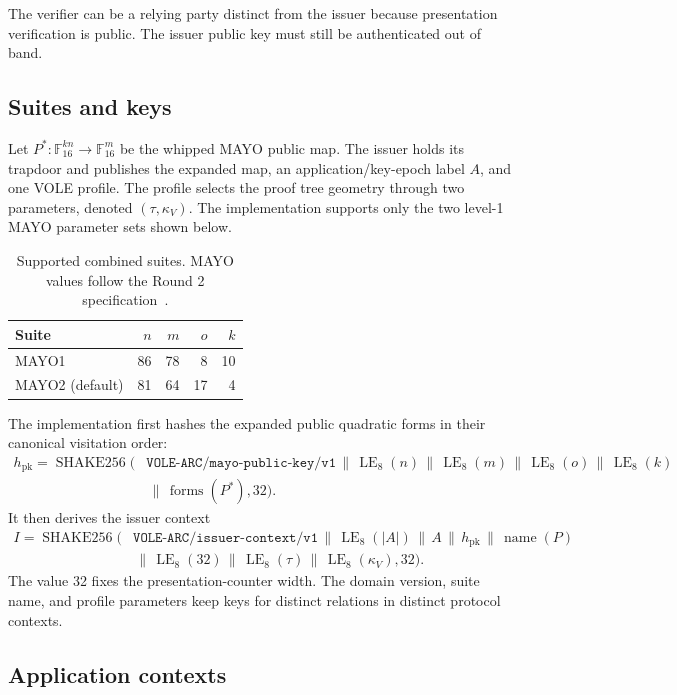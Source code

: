 \documentclass[11pt]{article}
\newcommand{\concat}{\,\|\,}
\newcommand{\F}{\mathbb{F}_{16}}
\newcommand{\LE}[1]{\operatorname{LE}_{#1}}
\newcommand{\XOF}{\operatorname{SHAKE256}}
\newcommand{\domain}[1]{\texttt{#1}}
\theoremstyle{remark}
\begin{document}
The verifier can be a relying party distinct from the issuer because
presentation verification is public. The issuer public key must still be
authenticated out of band.

\subsection{Suites and keys}

Let $P^*:\F^{kn}\rightarrow\F^m$ be the whipped MAYO public map. The issuer
holds its trapdoor and publishes the expanded map, an application/key-epoch
label $A$, and one VOLE profile. The profile selects the proof tree geometry
through two parameters, denoted $(\tau,\kappa_V)$. The implementation
supports only the two level-1 MAYO parameter sets shown below.

\begin{table}[H]
  \centering
  \caption{Supported combined suites. MAYO values follow the Round 2
  specification~\cite{mayo-round2}.}
  \begin{tabular}{lrrrr}
    \toprule
    Suite & $n$ & $m$ & $o$ & $k$ \\
    \midrule
    MAYO1 & 86 & 78 & 8 & 10 \\
    MAYO2 (default) & 81 & 64 & 17 & 4 \\
    \bottomrule
  \end{tabular}
\end{table}

The implementation first hashes the expanded public quadratic forms in their
canonical visitation order:
\begin{align*}
  h_{\mathrm{pk}} = \XOF(&
    \domain{VOLE-ARC/mayo-public-key/v1} \concat
    \LE{8}(n) \concat \LE{8}(m) \concat \LE{8}(o) \concat \LE{8}(k) \\
    &{}\concat \operatorname{forms}(P^*), 32).
\end{align*}
It then derives the issuer context
\begin{align*}
 I = \XOF(&\domain{VOLE-ARC/issuer-context/v1} \concat
   \LE{8}(|A|) \concat A \concat h_{\mathrm{pk}} \concat
   \operatorname{name}(P) \\
   &{}\concat \LE{8}(32) \concat \LE{8}(\tau) \concat
   \LE{8}(\kappa_V),32).
\end{align*}
The value 32 fixes the presentation-counter width. The domain version, suite
name, and profile parameters keep keys for distinct relations in distinct
protocol contexts.

\subsection{Application contexts}
\end{document}
